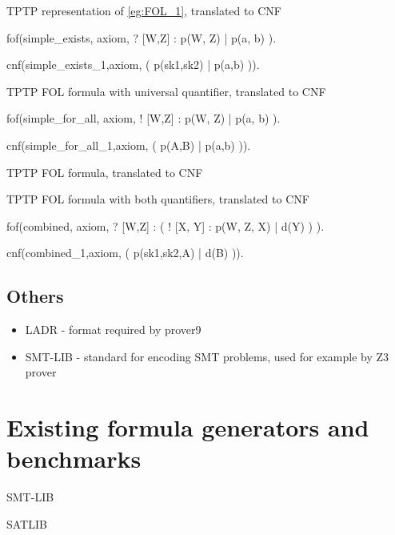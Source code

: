 \begin{listing}[ht]
  \caption{TPTP representation of \ref{eg:FOL_1}, translated to CNF}
\begin{tptpcode}
fof(simple_exists, axiom,
 ? [W,Z] :  p(W, Z) | p(a, b)
  ).

cnf(simple_exists_1,axiom,
    ( p(sk1,sk2) | p(a,b) )).
\end{tptpcode}
\end{listing}

\begin{listing}[ht]
  \caption{TPTP FOL formula with universal quantifier, translated to CNF}
\begin{tptpcode}
fof(simple_for_all, axiom,
 ! [W,Z] :  p(W, Z) | p(a, b)
  ).

cnf(simple_for_all_1,axiom,
    ( p(A,B) | p(a,b) )).
\end{tptpcode}
\end{listing}

\begin{listing}[ht]
  \caption{TPTP FOL formula, translated to CNF}
\end{listing}

\begin{listing}[ht]
  \caption{TPTP FOL formula with both quantifiers, translated to CNF}
\begin{tptpcode}
fof(combined, axiom,
 ? [W,Z] : ( ! [X, Y] : p(W, Z, X)  | d(Y) )
  ).

cnf(combined_1,axiom,
    ( p(sk1,sk2,A) | d(B) )).
\end{tptpcode}
\end{listing}

\subsection{Others}

\begin{itemize}
  \item \gls{LADR} - format required by prover9
  \item SMT-LIB - standard for encoding SMT problems, used for example by Z3 prover
\end{itemize}


\section{Existing formula generators and benchmarks}

SMT-LIB \cite{BarFT-RR-17}

SATLIB \cite{Hol00}

